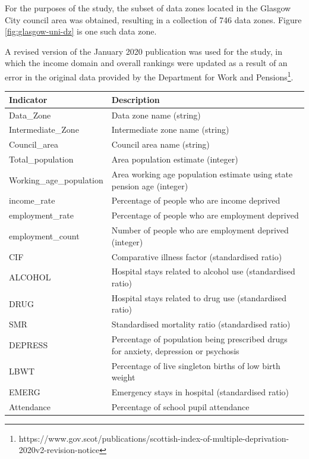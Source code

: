 \documentclass{thesis}
\begin{document}
For the purposes of the study, the subset of data zones located in the Glasgow City council area was obtained, resulting in a collection of 746 data zones. Figure \ref{fig:glasgow-uni-dz} is one such data zone.

A revised version of the January 2020 publication was used for the study, in which the income domain and overall rankings were updated as a result of an error in the original data provided by the Department for Work and Pensions\footnote{https://www.gov.scot/publications/scottish-index-of-multiple-deprivation-2020v2-revision-notice}.

\begin{table}[ht!]
    \centering
    \begin{tabular}{||l p{100mm}||} 
     \hline
     \textbf{Indicator} & \textbf{Description} \\ [0.5ex] 
     \hline\hline
     Data\_Zone & Data zone name (string) \\
     Intermediate\_Zone & Intermediate zone name (string) \\
     Council\_area & Council area name (string)  \\
     Total\_population & Area population estimate (integer) \\
     Working\_age\_population & Area working age population estimate using state pension age (integer) \\
     income\_rate & Percentage of people who are income deprived \\
     employment\_rate & Percentage of people who are employment deprived \\
     employment\_count & Number of people who are employment deprived (integer) \\
     CIF & Comparative illness factor (standardised ratio) \\
     ALCOHOL & Hospital stays related to alcohol use (standardised ratio) \\
     DRUG & Hospital stays related to drug use (standardised ratio) \\
     SMR & Standardised mortality ratio (standardised ratio) \\
     DEPRESS & Percentage of population being prescribed drugs for anxiety, depression or psychosis \\
     LBWT & Percentage of live singleton births of low birth weight \\
     EMERG & Emergency stays in hospital (standardised ratio) \\
     Attendance & Percentage of school pupil attendance \\

\end{tabular}
\end{table}
\end{document}
